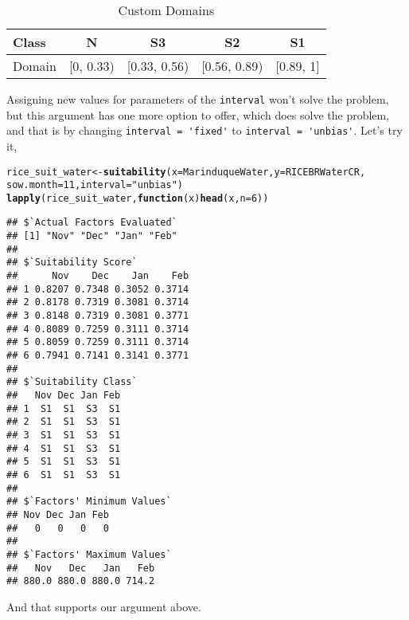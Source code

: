 \documentclass[11pt,fleqn]{article}\usepackage[]{graphicx}\usepackage[]{color}
\makeatletter
\newcommand{\hlnum}[1]{\textcolor[rgb]{0.686,0.059,0.569}{#1}}%
\newcommand{\hlstr}[1]{\textcolor[rgb]{0.192,0.494,0.8}{#1}}%
\newcommand{\hlstd}[1]{\textcolor[rgb]{0.345,0.345,0.345}{#1}}%
\newcommand{\hlkwa}[1]{\textcolor[rgb]{0.161,0.373,0.58}{\textbf{#1}}}%
\newcommand{\hlkwb}[1]{\textcolor[rgb]{0.69,0.353,0.396}{#1}}%
\newcommand{\hlkwc}[1]{\textcolor[rgb]{0.333,0.667,0.333}{#1}}%
\newcommand{\hlkwd}[1]{\textcolor[rgb]{0.737,0.353,0.396}{\textbf{#1}}}%
\newenvironment{kframe}{%
 \def\at@end@of@kframe{}%
 \ifinner\ifhmode%
  \def\at@end@of@kframe{\end{minipage}}%
  \begin{minipage}{\columnwidth}%
 \fi\fi%
 \def\FrameCommand##1{\hskip\@totalleftmargin \hskip-\fboxsep
 \colorbox{shadecolor}{##1}\hskip-\fboxsep
     \hskip-\linewidth \hskip-\@totalleftmargin \hskip\columnwidth}%
 \MakeFramed {\advance\hsize-\width
   \@totalleftmargin\z@ \linewidth\hsize
   \@setminipage}}%
 {\par\unskip\endMakeFramed%
 \at@end@of@kframe}
\newenvironment{knitrout}{}{} %
\makeatother
\begin{document}
\begin{table}[h]
\begin{tabular}{lcccc}
\toprule
Class&N&S3&S2&S1\\
\midrule
Domain&[0, 0.33)&[0.33, 0.56)&[0.56, 0.89)&[0.89, 1]\\
\bottomrule
\end{tabular}
\caption{Custom Domains}
\label{tab:cdomain}
\end{table}

Assigning new values for parameters of the \verb|interval| won't solve the problem, but this argument has one more option to offer, which does solve the problem, and that is by changing \verb|interval = 'fixed'| to \verb|interval = 'unbias'|. Let's try it,
\begin{knitrout}
\color{fgcolor}\begin{kframe}
\begin{alltt}
\hlstd{rice_suit_water} \hlkwb{<-} \hlkwd{suitability}\hlstd{(}\hlkwc{x} \hlstd{= MarinduqueWater,} \hlkwc{y} \hlstd{= RICEBRWaterCR,}
    \hlkwc{sow.month} \hlstd{=} \hlnum{11}\hlstd{,} \hlkwc{interval} \hlstd{=} \hlstr{"unbias"}\hlstd{)}
\hlkwd{lapply}\hlstd{(rice_suit_water,} \hlkwa{function}\hlstd{(}\hlkwc{x}\hlstd{)} \hlkwd{head}\hlstd{(x,} \hlkwc{n} \hlstd{=} \hlnum{6}\hlstd{))}
\end{alltt}
\begin{verbatim}
## $`Actual Factors Evaluated`
## [1] "Nov" "Dec" "Jan" "Feb"
## 
## $`Suitability Score`
##      Nov    Dec    Jan    Feb
## 1 0.8207 0.7348 0.3052 0.3714
## 2 0.8178 0.7319 0.3081 0.3714
## 3 0.8148 0.7319 0.3081 0.3771
## 4 0.8089 0.7259 0.3111 0.3714
## 5 0.8059 0.7259 0.3111 0.3714
## 6 0.7941 0.7141 0.3141 0.3771
## 
## $`Suitability Class`
##   Nov Dec Jan Feb
## 1  S1  S1  S3  S1
## 2  S1  S1  S3  S1
## 3  S1  S1  S3  S1
## 4  S1  S1  S3  S1
## 5  S1  S1  S3  S1
## 6  S1  S1  S3  S1
## 
## $`Factors' Minimum Values`
## Nov Dec Jan Feb 
##   0   0   0   0 
## 
## $`Factors' Maximum Values`
##   Nov   Dec   Jan   Feb 
## 880.0 880.0 880.0 714.2
\end{verbatim}
\end{kframe}
\end{knitrout}
\noindent And that supports our argument above.
\end{document}
